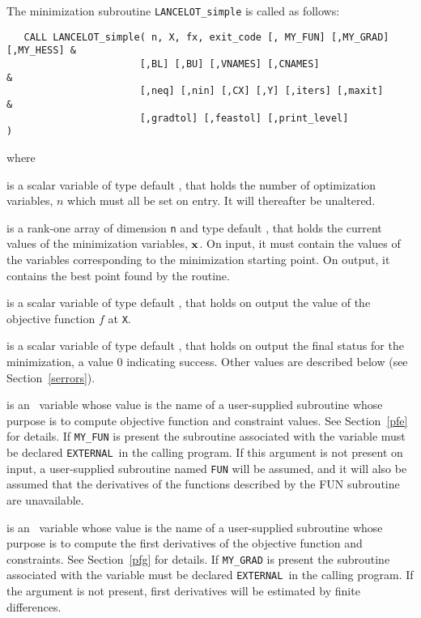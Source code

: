 \documentclass{galahad}
\newcommand{\external}{{\tt EXTERNAL}}
\begin{document}
The minimization subroutine {\tt LANCELOT\_simple} is called as follows:
\hskip0.5in 
\def\baselinestretch{0.8} {\tt \begin{verbatim}
   CALL LANCELOT_simple( n, X, fx, exit_code [, MY_FUN] [,MY_GRAD] [,MY_HESS] & 
                       [,BL] [,BU] [,VNAMES] [,CNAMES]                        & 
                       [,neq] [,nin] [,CX] [,Y] [,iters] [,maxit]             & 
                       [,gradtol] [,feastol] [,print_level]                   ) 
\end{verbatim}}
\def\baselinestretch{1.0}
\noindent
where
\begin{description}
 is a scalar variable of type default \integer, that holds 
the number of optimization variables, $n$ which must all be set on entry. It
will thereafter be unaltered.

 is a rank-one array of dimension {\tt n} and type 
default \realdp, that holds the current values of the 
minimization variables, ${\mathbf{x}}$. On input, it must contain the values of the
variables corresponding to the minimization starting point.  On output, it
contains the best point found by the routine.

 is a scalar variable of type default \realdp, that
holds  on output the value of the objective function $f$ at {\tt X}.

 is a scalar variable of type default \integer, that holds 
on output the final status for the minimization, a value 0 indicating
success.  Other values are described below (see Section~\ref{serrors}).

 is an \optional\ variable whose value is the name of a 
user-supplied subroutine whose purpose is to compute objective function 
and constraint values. See Section~\ref{pfe} for details. 
If {\tt MY\_FUN} is present the subroutine associated with the variable must be 
declared \external\ in the calling program.
If this argument is not present on input, a user-supplied subroutine 
named {\tt FUN} will be assumed, and it will also be assumed that the
derivatives of the functions described by the FUN subroutine are unavailable.

 is an \optional\ variable whose value is the name of a 
user-supplied subroutine whose purpose is to compute the first derivatives
of the objective function and constraints. See Section~\ref{pfg} for details. 
If {\tt MY\_GRAD} is present the subroutine associated with the variable must be 
declared \external\ in the calling program. If the argument is not present,
first derivatives will be estimated by finite differences.


\end{description}
\end{document}
